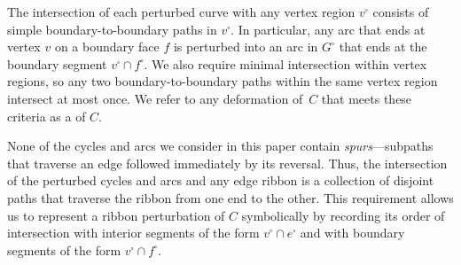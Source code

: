 \documentclass[letterpaper,review]{siamart190516}
\begin{document}
The intersection of each perturbed curve with any vertex region $v^\square$ consists of simple boundary-to-boundary paths in $v^\square$.  In particular, any arc that ends at vertex $v$ on a boundary face $f$ is perturbed into an arc in $G^\square$ that ends at the boundary segment $v^\square \cap f^\square$.  We also require minimal intersection within vertex regions, so any two boundary-to-boundary paths within the same vertex region intersect at most once.  We refer to any deformation of~$C$ that meets these criteria as a  of $C$.

None of the cycles and arcs we consider in this paper contain \emph{spurs}—subpaths that traverse an edge followed immediately by its reversal.  Thus, the intersection of the perturbed cycles and arcs and any edge ribbon is a collection of disjoint paths that traverse the ribbon from one end to the other.  This requirement allows us to represent a ribbon perturbation of $C$ symbolically by recording its order of intersection with interior segments of the form $v^\square\cap e^\square$ and with boundary segments of the form $v^\square\cap f^\square$.
\end{document}

